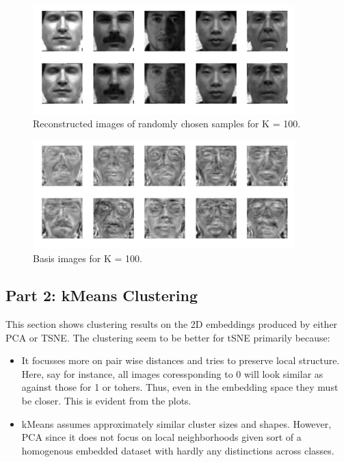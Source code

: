 \documentclass[a4paper,11pt]{article}
\begin{document}
\begin{mlsolution}
\begin{figure}[!htbp]
	\centering
	\includegraphics[width=0.9\textwidth, height=0.4\linewidth]{images/img_k_100.png}
	\caption[k = 100]{Reconstructed images of randomly chosen samples for K = 100.}
\end{figure}
\begin{figure}[!htbp]
	\centering
	\includegraphics[width=0.9\textwidth, height=0.4\linewidth]{images/template_weights_k_100.png}
	\caption[k = 100]{Basis images for K = 100.}
\end{figure}

\pagebreak

\subsection{Part 2: kMeans Clustering}
This section shows clustering results on the 2D embeddings produced by either PCA or TSNE. The clustering seem to be better for tSNE primarily because:
\begin{itemize}
	\item It focusses more on pair wise distances and tries to preserve local structure. Here, say for instance, all images coressponding to 0 will look similar as against those for 1 or tohers. Thus, even in the embedding space they must be closer. This is evident from the plots.
	\item kMeans assumes approximately similar cluster sizes and shapes. However, PCA since it does not focus on local neighborhoods given sort of a homogenous embedded dataset with hardly any distinctions across classes.
\end{itemize}



\end{mlsolution}
\end{document}
